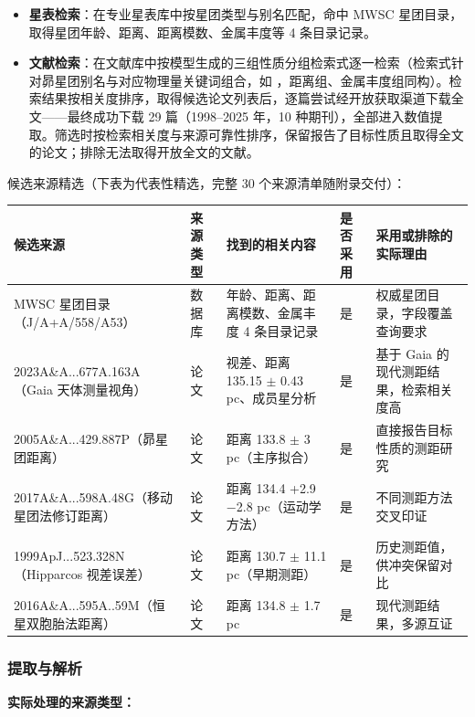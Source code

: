 \begin{itemize}[leftmargin=1.2em,itemsep=1pt]
\item \textbf{星表检索}：在专业星表库中按星团类型与别名匹配，命中 MWSC 星团目录，取得星团年龄、距离、距离模数、金属丰度等 4 条目录记录。
\item \textbf{文献检索}：在文献库中按模型生成的三组性质分组检索式逐一检索（检索式针对昴星团别名与对应物理量关键词组合，如 ，距离组、金属丰度组同构）。检索结果按相关度排序，取得候选论文列表后，逐篇尝试经开放获取渠道下载全文——最终成功下载 29 篇（1998--2025 年，10 种期刊），全部进入数值提取。筛选时按检索相关度与来源可靠性排序，保留报告了目标性质且取得全文的论文；排除无法取得开放全文的文献。
\end{itemize}

\noindent 候选来源精选（下表为代表性精选，完整 30 个来源清单随附录交付）：

\begin{longtable}{@{}p{3.4cm}p{1.8cm}p{4.2cm}p{1.6cm}p{3.4cm}@{}}
\toprule
候选来源 & 来源类型 & 找到的相关内容 & 是否采用 & 采用或排除的实际理由 \\
\midrule
MWSC 星团目录（J/A+A/558/A53） & 数据库 & 年龄、距离、距离模数、金属丰度 4 条目录记录 & 是 & 权威星团目录，字段覆盖查询要求 \\
2023A\&A...677A.163A（Gaia 天体测量视角） & 论文 & 视差、距离 135.15 $\pm$ 0.43 pc、成员星分析 & 是 & 基于 Gaia 的现代测距结果，检索相关度高 \\
2005A\&A...429.887P（昴星团距离） & 论文 & 距离 133.8 $\pm$ 3 pc（主序拟合） & 是 & 直接报告目标性质的测距研究 \\
2017A\&A...598A.48G（移动星团法修订距离） & 论文 & 距离 134.4 +2.9 $-$2.8 pc（运动学方法） & 是 & 不同测距方法交叉印证 \\
1999ApJ...523.328N（Hipparcos 视差误差） & 论文 & 距离 130.7 $\pm$ 11.1 pc（早期测距） & 是 & 历史测距值，供冲突保留对比 \\
2016A\&A...595A..59M（恒星双胞胎法距离） & 论文 & 距离 134.8 $\pm$ 1.7 pc & 是 & 现代测距结果，多源互证 \\
\bottomrule
\end{longtable}

\subsubsection{提取与解析}

\noindent\textbf{实际处理的来源类型：}

